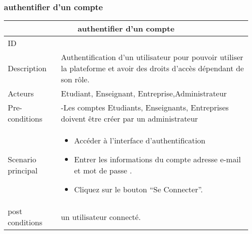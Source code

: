 \documentclass[11pt,fleqn]{book} %
\begin{document}
\subsubsection{authentifier d'un compte}
\begin{center}
\begin{tabularx}{1\textwidth} { | p{4cm} | >{\raggedright\arraybackslash}X |  }
  \hline
  \multicolumn{2}{|c|}{authentifier d'un compte} \\
 \hline
 ID & 3  \\
 \hline
 Description  & Authentification d’un utilisateur pour pouvoir utiliser la 
plateforme et avoir des droits d’accès dépendant de son rôle.   \\
  \hline
 Acteurs  & Etudiant, Enseignant, Entreprise,Administrateur   \\
  \hline
 Pre-conditions  & -Les comptes Etudiants, Enseignants, Entreprises doivent être créer par un administrateur\\
 \hline
 Scenario principal  &  
 \begin{itemize}
     \item Accéder à l'interface d’authentification 
      \item Entrer les informations du compte adresse e-mail et mot 
de passe . 
      \item Cliquez sur le bouton “Se Connecter”.
 \end{itemize}\\
  \hline
 post conditions  & un utilisateur connecté.  \\
  \hline
\end{tabularx}
\label{tbl:nicetablelesstable}
\end{center}
\end{document}
